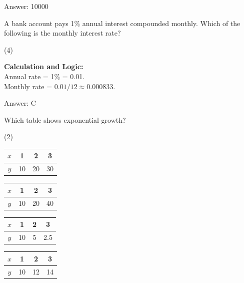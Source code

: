 \documentclass[11pt,paper=a4,answers]{exam}
\begin{document}
\begin{questions}
\begin{solution}
\vspace{25pt}

Answer: \colorbox{yellow!100}{10000}
\end{solution}

\vspace{40pt}

\question
A bank account pays 1\% annual interest compounded monthly. Which of the following is the monthly interest rate?
\begin{tasks}(4)
\end{tasks}

\begin{solution}
\textbf{Calculation and Logic:} \\
Annual rate = 1\% = 0.01. \\
Monthly rate = $0.01 / 12 \approx 0.000833$.

\vspace{25pt}

Answer: \colorbox{yellow!100}{C}
\end{solution}

\vspace{40pt}

\question
Which table shows exponential growth?
\begin{tasks}(2)
    \task \begin{tabular}{|c|c|c|c|} \hline $x$ & 1 & 2 & 3 \\ \hline $y$ & 10 & 20 & 30 \\ \hline \end{tabular}
    \task \begin{tabular}{|c|c|c|c|} \hline $x$ & 1 & 2 & 3 \\ \hline $y$ & 10 & 20 & 40 \\ \hline \end{tabular}
    \task \begin{tabular}{|c|c|c|c|} \hline $x$ & 1 & 2 & 3 \\ \hline $y$ & 10 & 5 & 2.5 \\ \hline \end{tabular}
    \task \begin{tabular}{|c|c|c|c|} \hline $x$ & 1 & 2 & 3 \\ \hline $y$ & 10 & 12 & 14 \\ \hline \end{tabular}
\end{tasks}


\end{questions}
\end{document}
